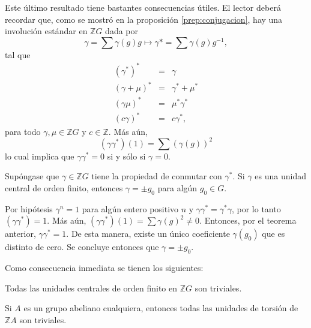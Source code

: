 Este último resultado tiene bastantes consecuencias útiles. El lector deberá recordar que, como se mostró en la proposición \ref{prep:conjugacion}, hay una involución estándar en $\mathds{Z}G$ dada por 
\begin{equation*}
\gamma = \sum\gamma(g)g \mapsto \gamma* = \sum\gamma(g)g^{-1},
\end{equation*}
tal que
\begin{eqnarray*}
(\gamma^*)^* &=& \gamma \\
(\gamma + \mu)^* &=& \gamma^* + \mu^*\\
(\gamma\mu)^* &=& \mu^*\gamma^*\\
(c\gamma)^* &=& c\gamma^*,
\end{eqnarray*}
para todo $\gamma, \mu \in \mathds{Z}G$ y $c \in \mathds{Z}$. Más aún, 
\begin{equation*}
(\gamma\gamma^*)(1) = \sum(\gamma(g))^2
\end{equation*}
lo cual implica que $\gamma\gamma^* = 0 $ si y sólo si $\gamma = 0$.

\begin{corolario}
Supóngase que $\gamma \in \mathds{Z}G$ tiene la propiedad de conmutar con $\gamma^*$. Si $\gamma$ es una unidad central de orden finito, entonces $\gamma = \pm g_0$ para algún $g_0 \in G$.
\end{corolario}
\begin{proof*}
Por hipótesis $\gamma^n = 1$ para algún entero positivo $n$ y $\gamma\gamma^* = \gamma^*\gamma$, por lo tanto $(\gamma\gamma^*) = 1$. Más aún, $(\gamma\gamma^*)(1) = \sum \gamma(g)^2 \neq 0$. Entonces, por el teorema anterior, $\gamma\gamma^* = 1$. De esta manera, existe un único coeficiente $\gamma(g_0)$ que es distinto de cero. Se concluye entonces que $\gamma = \pm g_0$. 
\end{proof*}
Como consecuencia inmediata se tienen los siguientes:
\begin{corolario}
Todas las unidades centrales de orden finito en $\mathds{Z}G$ son triviales.
\end{corolario}
\begin{corolario}
Si $A$ es un grupo abeliano cualquiera, entonces todas las unidades de torsión de $\mathds{Z}A$ son triviales.
\end{corolario}
